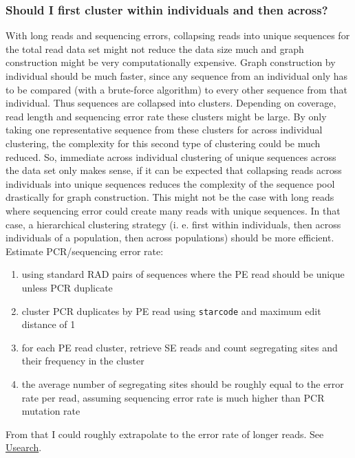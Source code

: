 \documentclass{article}\usepackage[]{graphicx}\usepackage[]{color}
\begin{document}
\subsubsection{Should I first cluster within individuals and then across? }
With long reads and sequencing errors, collapsing reads into unique sequences for the total read data set might not reduce the data size much and graph construction might be very computationally expensive. Graph construction by individual should be much faster, since any sequence from an individual only has to be compared (with a brute-force algorithm) to every other sequence from that individual. Thus sequences are collapsed into clusters. Depending on coverage, read length and sequencing error rate these clusters might be large. By only taking one representative sequence from these clusters for across individual clustering, the complexity for this second type of clustering could be much reduced. So, immediate across individual clustering of unique sequences across the data set only makes sense, if it can be expected that collapsing reads across individuals into unique sequences reduces the complexity of the sequence pool drastically for graph construction. This might not be the case with long reads where sequencing error could create many reads with unique sequences. In that case, a hierarchical clustering strategy (i. e. first within individuals, then across individuals of a population, then across populations) should be more efficient.
\newline\newline
Estimate PCR/sequencing error rate:
\begin{enumerate}
\item using standard RAD pairs of sequences where the PE read should be unique unless PCR duplicate
\item cluster PCR duplicates by PE read using \texttt{starcode} and maximum edit distance of 1
\item for each PE read cluster, retrieve SE reads and count segregating sites and their frequency in the cluster
\item the average number of segregating sites should be roughly equal to the error rate per read, assuming sequencing error rate is much higher than PCR mutation rate
\end{enumerate}
From that I could roughly extrapolate to the error rate of longer reads. See \href{http://bioinformatics.oxfordjournals.org/content/31/21/3476}{Usearch}.
\end{document}
